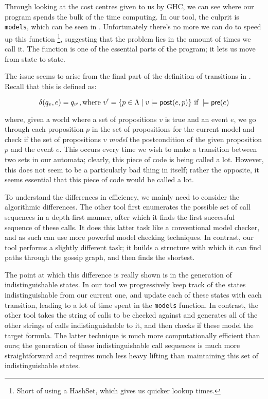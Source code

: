 \documentclass[12pt, a4paper]{article}
\begin{document}
Through looking at the cost centres given to us by GHC, we can see where our
program spends the bulk of the time computing. In our tool, the culprit is
\texttt{models}, which can be seen in . Unfortunately
there's no more we can do to speed up this function \footnote{Short of using a
  HashSet, which gives us quicker lookup times.}, suggesting that the problem
lies in the amount of times we call it. The function is one of the essential
parts of the program; it lets us move from state to state.

The issue seems to arise from the final part of the definition of transitions in
\mestar. Recall that this is defined as:

\begin{equation} \label{eq:delta1}
  \delta(q_v, e) = q_{v'}, \text{where } v' = \{p \in \Lambda \mid v \models \textsf{post}(e, p)\}
  \text{ if } 
  \models \textsf{pre}(e)
\end{equation}

\noindent where, given a world where a set of propositions $v$ is true and an
event $e$, we go through each proposition $p$ in the set of propositions for the
current model and check if the set of propositions $v$ \textit{model} the postcondition
of the given proposition $p$ and the event $e$. This occurs every time we wish
to make a transition between two sets in our automata; clearly, this piece of
code is being called a lot. However, this does not seem to be a particularly bad
thing in itself; rather the opposite, it seems essential that this piece of code
would be called a lot.

\bigskip

To understand the differences in efficiency, we mainly need to consider the
algorithmic differences. The other tool first enumerates the possible set of
call sequences in a depth-first manner, after which it finds the first
successful sequence of these calls. It does this latter task like a conventional
model checker, and as such can use more powerful model checking techniques. In
contrast, our tool performs a slightly different task; it builds a structure
with which it can find paths through the gossip graph, and then finds the
shortest.

The point at which this difference is really shown is in the generation of
indistinguishable states. In our tool we progressively keep track of the states
indistinguishable from our current one, and update each of these states with
each transition, leading to a lot of time spent in the \texttt{models} function.
In contrast, the other tool takes the string of calls to be checked against and
generates all of the other strings of calls indistinguishable to it, and then
checks if these model the target formula. The latter technique is much more
computationally efficient than ours; the generation of these indistinguishable
call sequences is much more straightforward and requires much less heavy lifting
than maintaining this set of indistinguishable states.
\end{document}

